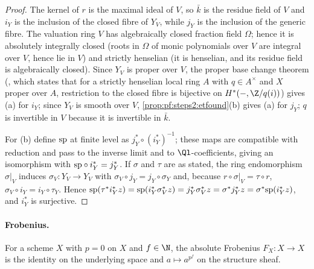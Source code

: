 \begin{proof}
The kernel of $r$ is the maximal ideal of $V$, so $\bar k$ is the residue field of $V$ and $i_Y$ is
the inclusion of the closed fibre of $Y_V$, while $j_Y$ is the inclusion of the generic fibre. The
valuation ring $V$ has algebraically closed fraction field $\Omega$; hence it is absolutely
integrally closed (roots in $\Omega$ of monic polynomials over $V$ are integral over $V$, hence lie
in $V$) and strictly henselian (it is henselian, and its residue field is algebraically closed).
Since $Y_V$ is proper over $V$, the proper base change theorem
(, which states that for a strictly henselian local ring
$A$ with $q\in A^\times$ and $X$ proper over $A$, restriction to the closed fibre is bijective on
$H^\ast(-,\Z/q(i))$) gives (a) for $i_Y$; since $Y_V$ is smooth over $V$,
\cref{prop:pf:steps2:etfound}(b) gives (a) for $j_Y$; $q$ is invertible in $V$ because it is
invertible in $\bar k$.

For (b) define $\mathrm{sp}$ at finite level as $j_Y^\ast\circ(i_Y^\ast)^{-1}$; these maps are
compatible with reduction and pass to the inverse limit and to $\Ql$-coefficients, giving an
isomorphism with $\mathrm{sp}\circ i_Y^\ast=j_Y^\ast$. If $\sigma$ and $\tau$ are as stated, the ring
endomorphism $\sigma|_V$ induces $\sigma_V\colon Y_V\to Y_V$ with $\sigma_V\circ j_Y=j_Y\circ\sigma_Y$
and, because $r\circ\sigma|_V=\tau\circ r$, $\sigma_V\circ i_Y=i_Y\circ\tau_Y$. Hence
$\mathrm{sp}(\tau^\ast i_Y^\ast z)=\mathrm{sp}(i_Y^\ast\sigma_V^\ast z)=j_Y^\ast\sigma_V^\ast z=
\sigma^\ast j_Y^\ast z=\sigma^\ast\mathrm{sp}(i_Y^\ast z)$, and $i_Y^\ast$ is surjective.
\end{proof}

\paragraph{Frobenius.}
For a scheme $X$ with $p=0$ on $X$ and $f\in\N$, the absolute Frobenius $F_X\colon X\to X$ is the
identity on the underlying space and $a\mapsto a^{p^f}$ on the structure sheaf.

